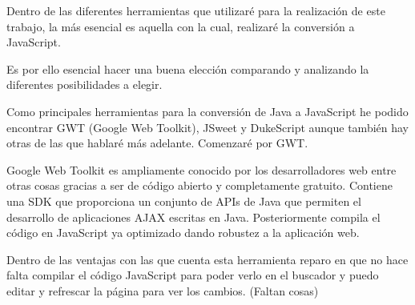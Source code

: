 
Dentro de las diferentes herramientas que utilizaré para la realización de este trabajo, la más esencial es aquella con la cual, realizaré la conversión a JavaScript.

Es por ello esencial hacer una buena elección comparando y analizando la diferentes posibilidades a elegir.

Como principales herramientas para la conversión de Java a JavaScript he podido encontrar GWT (Google Web Toolkit), JSweet y DukeScript aunque también hay otras de las que hablaré más adelante. Comenzaré por GWT.

Google Web Toolkit es ampliamente conocido por los desarrolladores web entre otras cosas gracias a ser de código abierto y completamente gratuito. 
Contiene una SDK que proporciona un conjunto de APIs de Java que permiten el desarrollo de aplicaciones AJAX escritas en Java. Posteriormente compila el código en JavaScript ya optimizado dando robustez a la aplicación web.

Dentro de las ventajas con las que cuenta esta herramienta reparo en que no hace falta compilar el código JavaScript para poder verlo en el buscador y puedo editar y refrescar la página para ver los cambios. (Faltan cosas)

